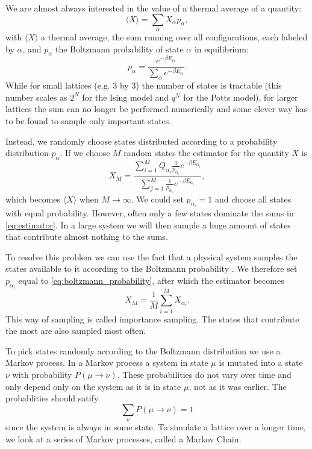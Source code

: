 \documentclass[11pt, a4paper]{report} %
\begin{document}
We are almost always interested in the value of a thermal average of a quantity:
\begin{equation}
	\langle X \rangle = \sum_{\alpha}X_{\alpha}p_{\alpha},
\end{equation}
with \(\langle X \rangle\) a thermal average, the sum running over all configurations, each labeled by \(\alpha\), and \(p_{\alpha}\) the Boltzmann probability of state \(\alpha\) in equilibrium\cite{binney:1992}:
\begin{equation} \label{eq:boltzmann_probability}
	p_{\alpha} = \frac{e^{-\beta E_{\alpha}}}{\sum_{\alpha}e^{-\beta E_{\alpha}}}.
\end{equation}
While for small lattices (e.g. 3 by 3) the number of states is tractable (this number scales as \(2^{N}\) for the Ising model and \(q^{N}\) for the Potts model), for larger lattices the sum can no longer be performed numerically and some clever way has to be found to sample only important states.

Instead, we randomly choose states distributed according to a probability distribution \(p_{\alpha}\).
If we choose \(M\) random states the estimator for the quantity \(X\) is
\begin{equation} \label{eq:estimator}
	X_M = \frac{\sum_{i=1}^M Q_{\alpha_i}\frac{1}{p_{\alpha_i}}e^{-\beta E_{\alpha_i}}}{\sum_{j=1}^M \frac{1}{p_{\alpha_i}} e^{-\beta E_{\alpha_i}}},
\end{equation}
which becomes \(\langle X \rangle\) when \(M \to \infty\).
We could set \(p_{\alpha_i}=1\) and choose all states with equal probability.
However, often only a few states dominate the sums in \cref{eq:estimator}.
In a large system we will then sample a huge amount of states that contribute almost nothing to the sums.\cite{newman:1999}

To resolve this problem we can use the fact that a physical system samples the states available to it according to the Boltzmann probability .
We therefore set \(p_{\alpha_i}\) equal to \cref{eq:boltzmann_probability}, after which the estimator becomes
\begin{equation}
	X_M = \frac{1}{M} \sum_{i=1}^M X_{\alpha_i}.
\end{equation}
This way of sampling is called importance sampling. The states that contribute the most are also sampled most often.\cite{newman:1999}

To pick states randomly according to the Boltzmann distribution we use a Markov process.
In a Markov process a system in state \(\mu\) is mutated into a state \(\nu\) with probability \(P(\mu\to\nu)\).
These probabilities do not vary over time and only depend only on the system as it is in state \(\mu\), not as it was earlier.
The probablities should satify
\begin{equation}
	\sum_{\nu} P(\mu \to \nu) = 1
\end{equation}
since the system is always in some state.\cite{newman:1999,landau:2015}
To simulate a lattice over a longer time, we look at a series of Markov processes, called a Markov Chain.
\end{document}

